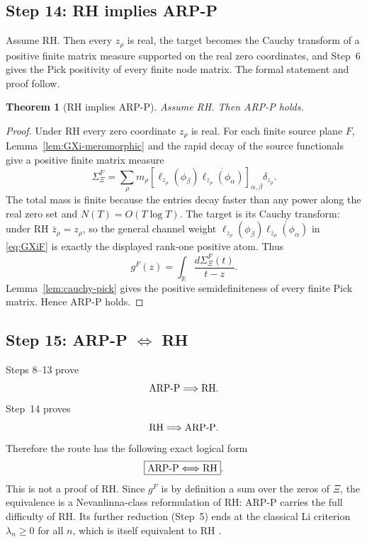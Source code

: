 \documentclass[11pt]{amsart}
\newtheorem{theorem}{Theorem}[section]
\theoremstyle{definition}
\theoremstyle{remark}
\theoremstyle{definition}
\newcommand{\R}{\mathbb{R}}
\begin{document}
\subsection{Step 14: RH implies ARP-P}

Assume RH.  Then every $z_\rho$ is real, the target becomes the Cauchy transform of a positive finite
matrix measure supported on the real zero coordinates, and Step~6 gives the Pick positivity of every
finite node matrix.  The formal statement and proof follow.

\begin{theorem}[RH implies ARP-P]\label{thm:rh-pick}
Assume RH.  Then ARP-P holds.
\end{theorem}

\begin{proof}
Under RH every zero coordinate $z_\rho$ is real.  For each finite source plane $F$, Lemma~\ref{lem:GXi-meromorphic}
and the rapid decay of the source functionals give a positive finite matrix measure
\[
   \Sigma_\Xi^F
   =
   \sum_\rho
   m_\rho
   \left[
      \ell_{z_\rho}(\phi_\beta)\overline{\ell_{z_\rho}(\phi_\alpha)}
   \right]_{\alpha,\beta}
   \delta_{z_\rho}.
\]
The total mass is finite because the entries decay faster than any power along the real zero set and
$N(T)=O(T\log T)$.  The target is its Cauchy transform:
under RH $\bar z_\rho=z_\rho$, so the general channel weight
$\ell_{z_\rho}(\phi_\beta)\overline{\ell_{\bar z_\rho}(\phi_\alpha)}$ in \eqref{eq:GXiF} is exactly the
displayed rank-one positive atom.  Thus
\[
   g^F(z)=\int_\R\frac{d\Sigma_\Xi^F(t)}{t-z}.
\]
Lemma~\ref{lem:cauchy-pick} gives the positive semidefiniteness of every finite Pick matrix.  Hence
ARP-P holds.
\end{proof}

\subsection{Step 15: ARP-P \texorpdfstring{$\Longleftrightarrow$}{<=>} RH}

Steps 8--13 prove
\[
   \textnormal{ARP-P}\Longrightarrow\textnormal{RH}.
\]
Step~14 proves
\[
   \textnormal{RH}\Longrightarrow\textnormal{ARP-P}.
\]
Therefore the route has the following exact logical form
\[
   \boxed{\textnormal{ARP-P}\Longleftrightarrow\textnormal{RH}}.
\]
This is not a proof of RH. Since $g^F$ is by definition a sum over the zeros of $\Xi$, the equivalence
is a Nevanlinna-class reformulation of RH: ARP-P carries the full difficulty of RH. Its further
reduction (Step~5) ends at the classical Li criterion $\lambda_n\ge0$ for all $n$, which is itself
equivalent to RH \cite{Li,BombieriLagarias1999}.
\end{document}
